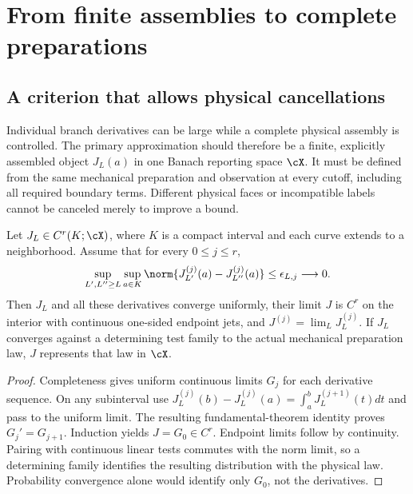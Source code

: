 \section{From finite assemblies to complete preparations}\label{sec:assembly}
\subsection{A criterion that allows physical cancellations}
Individual branch derivatives can be large while a complete physical assembly is controlled. The primary approximation should therefore be a finite, explicitly assembled object $J_L(a)$ in one Banach reporting space $\cX$. It must be defined from the same mechanical preparation and observation at every cutoff, including all required boundary terms. Different physical faces or incompatible labels cannot be canceled merely to improve a bound.

\begin{theorem}\label{thm:assembly}
Let $J_L\in C^r(K;\cX)$, where $K$ is a compact interval and each curve extends to a neighborhood. Assume that for every $0\le j\le r$,
\begin{equation}
 \sup_{L',L''\ge L}\sup_{a\in K}
 \norm{J_{L'}^{(j)}(a)-J_{L''}^{(j)}(a)}\le\epsilon_{L,j}\longrightarrow0.
 \label{eq:assembly-cauchy}
\end{equation}
Then $J_L$ and all these derivatives converge uniformly, their limit $J$ is $C^r$ on the interior with continuous one-sided endpoint jets, and $J^{(j)}=\lim_LJ_L^{(j)}$. If $J_L$ converges against a determining test family to the actual mechanical preparation law, $J$ represents that law in $\cX$.
\end{theorem}
\begin{proof}
Completeness gives uniform continuous limits $G_j$ for each derivative sequence. On any subinterval use
$J_L^{(j)}(b)-J_L^{(j)}(a)=\int_a^bJ_L^{(j+1)}(t)dt$ and pass to the uniform limit. The resulting fundamental-theorem identity proves $G_j'=G_{j+1}$. Induction yields $J=G_0\in C^r$. Endpoint limits follow by continuity. Pairing with continuous linear tests commutes with the norm limit, so a determining family identifies the resulting distribution with the physical law. Probability convergence alone would identify only $G_0$, not the derivatives.
\end{proof}


